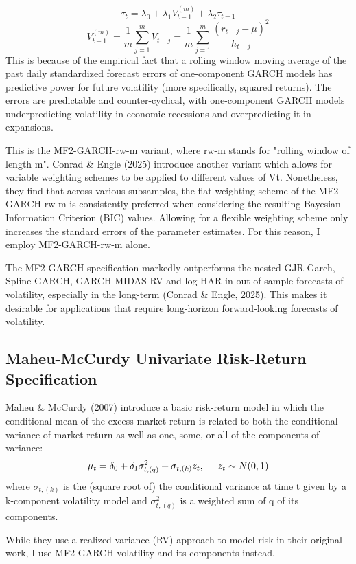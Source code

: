 \documentclass[12pt]{article}
\begin{document}
\begin{equation}
\tau_t=\lambda_0+\lambda_1V_{t-1}^{(m)}+\lambda_2\tau_{t-1}
\end{equation}
\begin{equation}
V_{t-1}^{(m)}=\frac{1}{m}\sum_{j=1}^mV_{t-j}=\frac{1}{m}\sum_{j=1}^m\frac{(r_{t-j}-\mu)^2}{h_{t-j}}
\end{equation}
This is because of the empirical fact that a rolling window moving average of the past daily standardized forecast errors of one-component GARCH models has predictive power for future volatility (more specifically, squared returns). The errors are predictable and counter-cyclical, with one-component GARCH models underpredicting volatility in economic recessions and overpredicting it in expansions. \par
This is the MF2-GARCH-rw-m variant, where rw-m stands for "rolling window of length m". Conrad \& Engle (2025) introduce another variant which allows for variable weighting schemes to be applied to different values of Vt. Nonetheless, they find that across various subsamples, the flat weighting scheme of the MF2-GARCH-rw-m is consistently preferred when considering the resulting Bayesian Information Criterion (BIC) values. Allowing for a flexible weighting scheme only increases the standard errors of the parameter estimates. For this reason, I employ MF2-GARCH-rw-m alone.\par
The MF2-GARCH specification markedly outperforms the nested GJR-Garch, Spline-GARCH, GARCH-MIDAS-RV and log-HAR in out-of-sample forecasts of volatility, especially in the long-term (Conrad \& Engle, 2025). This makes it desirable for applications that require long-horizon forward-looking forecasts of volatility.\par
\subsection{Maheu-McCurdy Univariate Risk-Return Specification}
Maheu \& McCurdy (2007) introduce a basic risk-return model in which the conditional mean of the excess market return is related to both the conditional variance of market return as well as one, some, or all of the components of variance:
\begin{equation}
\mu_t=\delta_0+\delta_1\sigma_{t,(q)}^2+\sigma_{t,(k)}z_t, \hspace{5mm}z_t\sim N(0,1)
\end{equation}
where $\sigma_{t,(k)}$ is the (square root of) the conditional variance at time t given by a k-component volatility model and $\sigma_{t,(q)}^2$ is a weighted sum of q of its components.\par
While they use a realized variance (RV) approach to model risk in their original work, I use MF2-GARCH volatility and its components instead.
\end{document}
